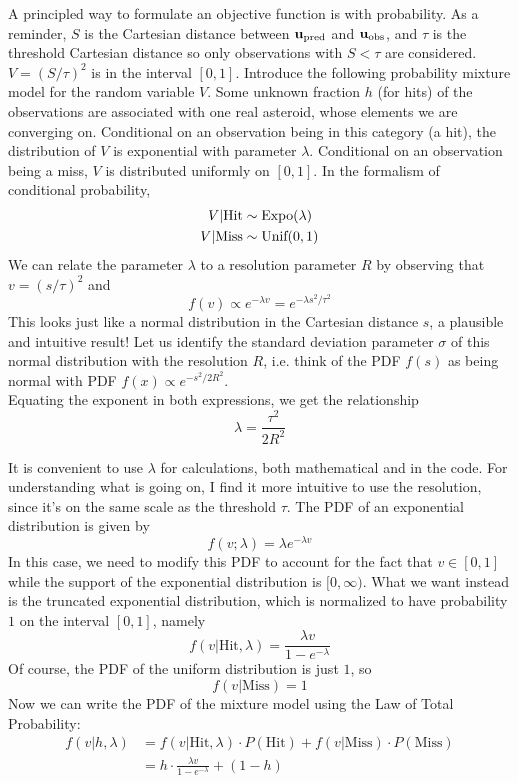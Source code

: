 A principled way to formulate an objective function is with probability.
As a reminder, $S$ is the Cartesian distance between $\mathbf{u}_{\mathrm{pred}}$ and $\mathbf{u}_{\mathrm{obs}}$,
and $\tau$ is the threshold Cartesian distance so only observations with $S < \tau$ are considered.
$V = (S / \tau)^{2}$ is in the interval $[0, 1]$.
Introduce the following probability mixture model for the random variable $V$.
Some unknown fraction $h$ (for hits) of the observations are associated with one real asteroid, whose elements we are converging on.
Conditional on an observation being in this category (a hit), the distribution of $V$ is exponential with parameter $\lambda$.
Conditional on an observation being a miss, $V$ is distributed uniformly on $[0,1]$.
In the formalism of conditional probability,
\begin{align*}
V | \textrm{Hit} &\sim \textnormal{Expo}(\lambda) \\
V | \textrm{Miss} &\sim \textnormal{Unif}(0,1)
\end{align*}
We can relate the parameter $\lambda$ to a resolution parameter $R$ by observing that $v=(s/\tau)^2$ and
$$f(v) \propto e^{-\lambda v} = e^{-\lambda s^2 / \tau^2}$$
This looks just like a normal distribution in the Cartesian distance $s$, a plausible and intuitive result!
Let us identify the standard deviation parameter $\sigma$ of this normal distribution with the resolution $R$,
i.e. think of the PDF $f(s)$ as being normal with PDF $f(x) \propto e^{-s^2 / 2 R^2}$.\\
Equating the exponent in both expressions, we get the relationship
$$ \lambda = \frac{\tau^2}{2R^2}$$

It is convenient to use $\lambda$ for calculations, both mathematical and in the code.
For understanding what is going on, I find it more intuitive to use the resolution, since it's on the same scale as the threshold $\tau$.
The PDF of an exponential distribution is given by \cite{BH}
$$ f(v; \lambda) =\lambda e^{-\lambda v}$$
In this case, we need to modify this PDF to account for the fact that $v \in [0,1]$ 
while the support of the exponential distribution is $[0, \infty)$.
What we want instead is the truncated exponential distribution, which is normalized to have probability $1$ on the interval $[0,1]$, namely
$$ f(v| \mathrm{Hit}, \lambda) = \frac{\lambda v}{1 - e^{-\lambda}}$$
Of course, the PDF of the uniform distribution is just $1$, so
$$ f(v | \mathrm{Miss}) = 1$$
Now we can write the PDF of the mixture model using the Law of Total Probability:
\begin{align*}
f(v| h, \lambda) &= f(v|\mathrm{Hit}, \lambda) \cdot P(\mathrm{Hit}) + f(v|\mathrm{Miss}) \cdot P(\mathrm{Miss}) \\
&= h \cdot \frac{\lambda v}{1 - e^{-\lambda}} + (1 - h)
\end{align*}


